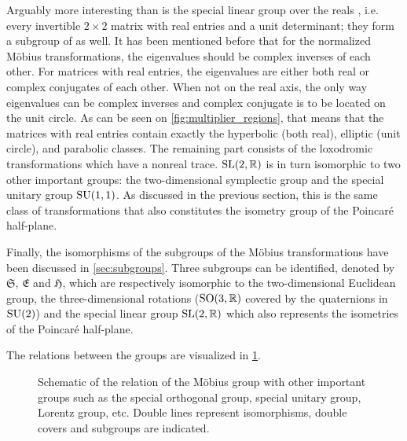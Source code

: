 Arguably more interesting than  is the special linear group over the reals , i.e. every invertible \(2 \times 2\) matrix with real entries and a unit determinant; they form a subgroup of  as well. It has been mentioned before that for the normalized Möbius transformations, the eigenvalues should be complex inverses of each other. For matrices with real entries, the eigenvalues are either both real or complex conjugates of each other. When not on the real axis, the only way eigenvalues can be complex inverses and complex conjugate is to be located on the unit circle. As can be seen on \cref{fig:multiplier_regions}, that means that the matrices with real entries contain exactly the hyperbolic (both real), elliptic (unit circle), and parabolic classes. The remaining part consists of the loxodromic transformations which have a nonreal trace. $\mathrm{SL}(2, \mathbb{R})$ is in turn isomorphic to two other important groups: the two-dimensional symplectic group  and the special unitary group $\mathrm{SU}(1,1)$. As discussed in the previous section, this is the same class of transformations that also constitutes the isometry group of the Poincaré half-plane.

Finally, the isomorphisms of the subgroups of the Möbius transformations have been discussed in \cref{sec:subgroups}. Three subgroups can be identified, denoted by $\mathfrak{S}$, $\mathfrak{E}$ and $\mathfrak{H}$, which are respectively isomorphic to the two-dimensional Euclidean group, the three-dimensional rotations ($\mathrm{SO}(3, \mathbb{R})$ covered by the quaternions in $\mathrm{SU}(2)$) and the special linear group $\mathrm{SL}(2, \mathbb{R})$ which also represents the isometries of the Poincaré half-plane.

The relations between the groups are visualized in \cref{fig:group_relations}.

\begin{figure}[h!]
    \centering
    
    \caption{Schematic of the relation of the Möbius group with other important groups such as the special orthogonal group, special unitary group, Lorentz group, etc. Double lines represent isomorphisms, double covers and subgroups are indicated.}
    \label{fig:group_relations}
\end{figure}
\FloatBarrier
